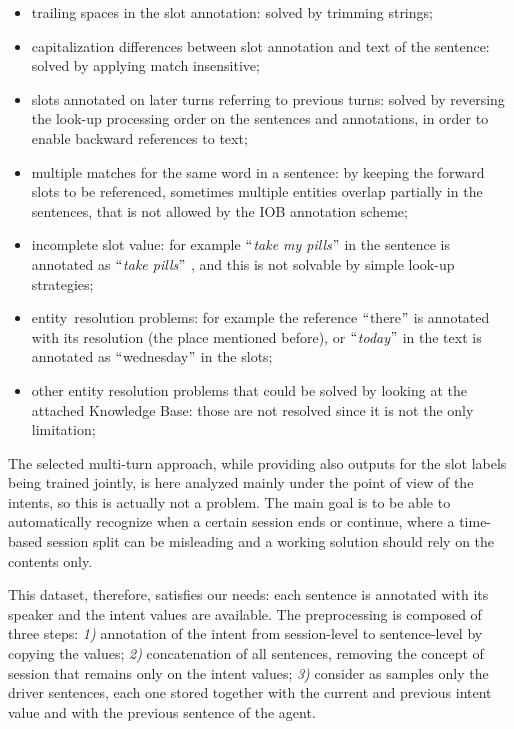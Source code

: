 \begin{itemize}
	\item trailing spaces in the slot annotation: solved by trimming strings;

	\item capitalization differences between slot annotation and text of the sentence: solved by applying match insensitive;

	\item slots annotated on later turns referring to previous turns: solved by reversing the look-up processing order on the sentences and annotations, in order to enable backward references to text;

	\item multiple matches for the same word in a sentence: by keeping the forward slots to be referenced, sometimes multiple entities overlap partially in the sentences, that is not allowed by the IOB annotation scheme;

	\item incomplete slot value: for example $``$\textit{take my pills}$"$  in the sentence is annotated as $``$\textit{take pills}$"$ , and this is not solvable by simple look-up strategies;

	\item entity\ resolution problems:  for example the reference $``$there$"$  is annotated with its resolution (the place mentioned before), or $``$\textit{today}$"$  in the text is annotated as $``$wednesday$"$  in the slots;

	\item other entity resolution problems that could be solved by looking at the attached Knowledge Base: those are not resolved since it is not the only limitation;
\end{itemize}

The selected multi-turn approach, while providing also outputs for the slot labels being trained jointly, is here analyzed mainly under the point of view of the intents, so this is actually not a problem. The main goal is to be able to automatically recognize when a certain session ends or continue, where a time-based session split can be misleading and a working solution should rely on the contents only.

This dataset, therefore, satisfies our needs: each sentence is annotated with its speaker and the intent values are available. The preprocessing is composed of three steps: \textit{1)} annotation of the intent from session-level to sentence-level by copying the values; \textit{2)} concatenation of all sentences, removing the concept of session that remains only on the intent values; \textit{3)} consider as samples only the driver sentences, each one stored together with the current and previous intent value and with the previous sentence of the agent.

